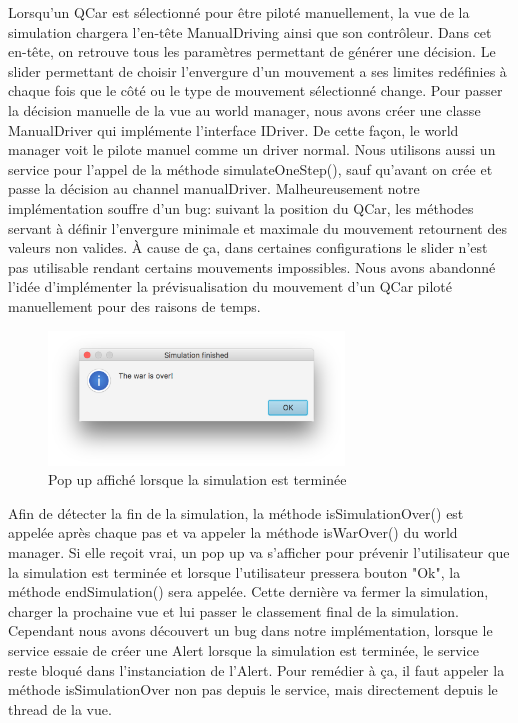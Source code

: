 \documentclass[a4paper, 12pt]{article}
\begin{document}
Lorsqu'un QCar est sélectionné pour être piloté manuellement, la vue de la simulation chargera l'en-tête ManualDriving ainsi que son contrôleur. Dans cet en-tête, on retrouve tous les paramètres permettant de générer une décision. Le slider permettant de choisir l'envergure d'un mouvement a ses limites redéfinies à chaque fois que le côté ou le type de mouvement sélectionné change. Pour passer la décision manuelle de la vue au world manager, nous avons créer une classe ManualDriver qui implémente l'interface IDriver. De cette façon, le world manager voit le pilote manuel comme un driver normal. Nous utilisons aussi un service pour l'appel de la méthode simulateOneStep(), sauf qu'avant on crée et passe la décision au channel manualDriver.
Malheureusement notre implémentation souffre d'un bug: suivant la position du QCar, les méthodes servant à définir l'envergure minimale et maximale du mouvement retournent des valeurs non valides. À cause de ça, dans certaines configurations le slider n'est pas utilisable rendant certains mouvements impossibles.
Nous avons abandonné l'idée d'implémenter la prévisualisation du mouvement d'un QCar piloté manuellement pour des raisons de temps.
\begin{figure}[H]
 \centering
 \includegraphics[width=0.7\textwidth]{includes/images/endpopup}
 \caption{\label{fig:endsim}Pop up affiché lorsque la simulation est terminée}
\end{figure}
Afin de détecter la fin de la simulation, la méthode isSimulationOver() est appelée après chaque pas et va appeler la méthode isWarOver() du world manager. Si elle reçoit vrai, un pop up va s'afficher pour prévenir l'utilisateur que la simulation est terminée et lorsque l'utilisateur pressera bouton "Ok", la méthode endSimulation() sera appelée. Cette dernière va fermer la simulation, charger la prochaine vue et lui passer le classement final de la simulation.
Cependant nous avons découvert un bug dans notre implémentation, lorsque le service essaie de créer une Alert lorsque la simulation est terminée, le service reste bloqué dans l'instanciation de l'Alert. Pour remédier à ça, il faut appeler la méthode isSimulationOver non pas depuis le service, mais directement depuis le thread de la vue. 
\end{document}
